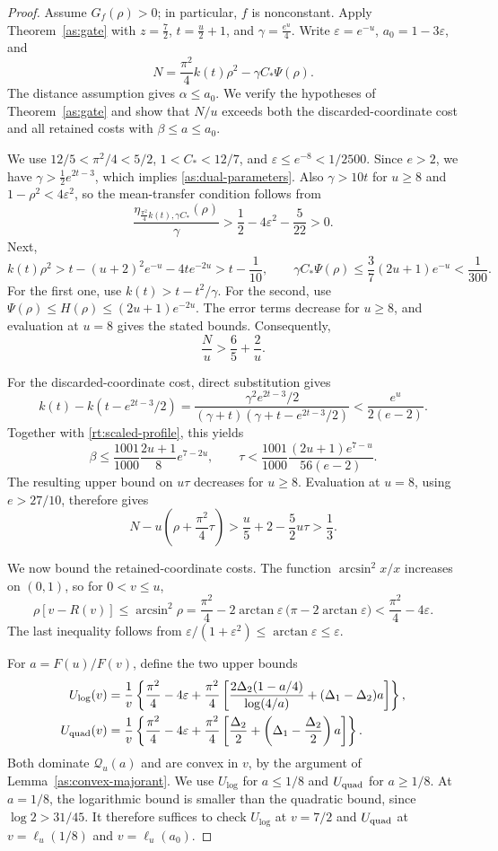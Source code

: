 \documentclass[11pt,letterpaper]{amsart}
\newcommand{\1}{\mathbf 1}
\numberwithin{equation}{section}
\begin{document}
\begin{proof}
Assume $G_f(\rho)>0$; in particular, $f$ is nonconstant.
Apply Theorem~\ref{as:gate} with
$z=\frac72$, $t=\frac u2+1$, and $\gamma=\frac{e^u}{4}$.
Write $\varepsilon=e^{-u}$, $a_0=1-3\varepsilon$, and
\[
 N=\frac{\pi^2}{4}k(t)\rho^2-\gamma C_*\Psi(\rho).
\]
The distance assumption gives $\alpha\le a_0$.
We verify the hypotheses of Theorem~\ref{as:gate} and show that
$N/u$ exceeds both the discarded-coordinate cost and all retained
costs with $\beta\le a\le a_0$.

We use
$12/5<\pi^2/4<5/2$, $1<C_*<12/7$, and
$\varepsilon\le e^{-8}<1/2500$.
Since $e>2$, we have
$\gamma>\tfrac12e^{2t-3}$, which implies
\eqref{as:dual-parameters}.
Also $\gamma>10t$ for $u\ge8$ and
$1-\rho^2<4\varepsilon^2$, so the mean-transfer condition follows from
\[
 \frac{\eta_{\frac{\pi^2}{4}k(t),\gamma C_*}(\rho)}{\gamma}
 >\frac12-4\varepsilon^2-\frac5{22}>0.
\]
Next,
\[
 k(t)\rho^2>t-(u+2)^2e^{-u}-4te^{-2u}
 >t-\frac1{10}, \qquad
 \gamma C_*\Psi(\rho)
 \le\frac37(2u+1)e^{-u}<\frac1{300}.
\]
For the first one, use $k(t)>t-t^2/\gamma$.
For the second, use
$\Psi(\rho)\le H(\rho)\le(2u+1)e^{-2u}$.
The error terms decrease for $u\ge8$, and evaluation at $u=8$
gives the stated bounds. Consequently,
\[
 \frac Nu>\frac65+\frac2u.
\]

For the discarded-coordinate cost, direct substitution gives
\[
 k(t)-k(t-e^{2t-3}/2)
 =\frac{\gamma^2 e^{2t-3}/2}
        {(\gamma+t)(\gamma+t-e^{2t-3}/2)}
 <\frac{e^u}{2(e-2)}.
\]
Together with \eqref{rt:scaled-profile}, this yields
\[
 \beta\le\frac{1001}{1000}\frac{2u+1}{8}e^{7-2u},
 \qquad
 \tau<\frac{1001}{1000}
          \frac{(2u+1)e^{7-u}}{56(e-2)}.
\]
The resulting upper bound on $u\tau$ decreases for $u\ge8$.
Evaluation at $u=8$, using $e>27/10$, therefore gives
\[
 N-u\left(\rho+\frac{\pi^2}{4}\tau\right)
 >\frac u5+2-\frac52u\tau>\frac13.
\]

We now bound the retained-coordinate costs.
The function $\arcsin^2 x/x$ increases on $(0,1)$, so for
$0<v\le u$,
\[
 \rho[v-R(v)]\le\arcsin^2\rho=\frac{\pi^2}{4}
   -2\arctan\varepsilon\,
      \bigl(\pi-2\arctan\varepsilon\bigr)
 <\frac{\pi^2}{4}-4\varepsilon.
\]
The last inequality follows from
$\varepsilon/(1+\varepsilon^2)
 \le\arctan\varepsilon\le\varepsilon$.

For $a=F(u)/F(v)$, define the two upper bounds
\[
 \begin{split}
 U_{\log}(v)
 &=\frac1v\left\{
   \frac{\pi^2}{4}-4\varepsilon
   +\frac{\pi^2}{4}
     \left[\frac{2\Delta_2(1-a/4)}{\log(4/a)}
                  +(\Delta_1-\Delta_2)a\right]\right\},\\
 U_{\rm quad}(v)
 &=\frac1v\left\{
   \frac{\pi^2}{4}-4\varepsilon
   +\frac{\pi^2}{4}
     \left[\frac{\Delta_2}{2}
                  +\left(\Delta_1-\frac{\Delta_2}{2}\right)a\right]
   \right\}.
 \end{split}
\]
Both dominate $\mathcal Q_u(a)$ and are convex in $v$,
by the argument of Lemma~\ref{as:convex-majorant}.
We use $U_{\log}$ for $a\le1/8$ and $U_{\rm quad}$ for $a\ge1/8$.
At $a=1/8$, the logarithmic bound is smaller than the quadratic
bound, since $\log2>31/45$.
It therefore suffices to check $U_{\log}$ at $v=7/2$ and
$U_{\rm quad}$ at $v=\ell_u(1/8)$ and $v=\ell_u(a_0)$.


\end{proof}
\end{document}
